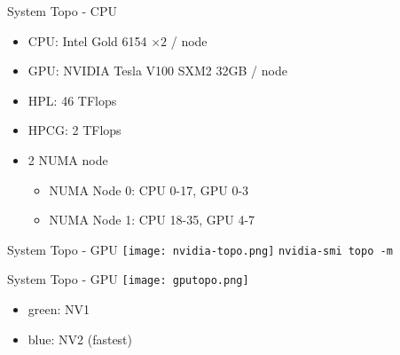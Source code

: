 \documentclass[aspectratio=169]{beamer}
\begin{document}
    \begin{frame}{System Topo - CPU}
        \begin{itemize}
            \item CPU: Intel Gold 6154 $\times 2$ / node
            \item GPU: NVIDIA Tesla V100 SXM2 32GB  / node
            \item HPL: 46 TFlops
            \item HPCG: 2 TFlops
        \end{itemize}
        \begin{itemize}
            \item 2 NUMA node
            \begin{itemize}
                \item NUMA Node 0: CPU 0-17, GPU 0-3
                \item NUMA Node 1: CPU 18-35, GPU 4-7
            \end{itemize}
        \end{itemize}
    \end{frame}

    \begin{frame}{System Topo - GPU}
        \centering\texttt{[image: nvidia-topo.png]}
        \newline
        \texttt{nvidia-smi topo -m}
    \end{frame}

    \begin{frame}{System Topo - GPU}
        \centering\texttt{[image: gputopo.png]}
        \begin{itemize}
            \item green: NV1
            \item blue: NV2 (fastest)
        \end{itemize}
    \end{frame}
\end{document}
